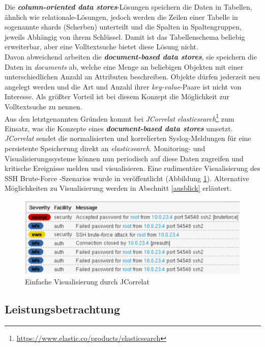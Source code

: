 Die \textbf{\emph{column-oriented data stores}}-Lösungen speichern die Daten in Tabellen, 
ähnlich wie relationale-Lösungen, jedoch werden die Zeilen einer Tabelle in sogenannte 
shards (Scherben) unterteilt und die Spalten in Spaltengruppen, jeweils Abhängig von 
ihrem Schlüssel. Damit ist das Tabellenschema beliebig erweiterbar, aber eine 
Volltextsuche bietet diese Lösung nicht.\\

Davon abweichend arbeiten die \textbf{\emph{document-based data stores}}, sie speichern 
die Daten in \textit{documents} ab, welche eine Menge an beliebigen Objekten mit einer 
unterschiedlichen Anzahl an Attributen beschreiben. Objekte dürfen jederzeit neu 
angelegt werden und die Art und Anzahl ihrer \textit{key-value}-Paare ist nicht von 
Interesse. Als größter Vorteil ist bei diesem Konzept die Möglichkeit zur Volltextsuche 
zu nennen.\\

Aus den letztgenannten Gründen kommt bei \textit{JCorrelat} 
\textit{elasticsearch}\footnote{\url{https://www.elastic.co/products/elasticsearch}} zum 
Einsatz, was die Konzepte eines \textbf{\emph{document-based data stores}} umsetzt. 
\textit{JCorrelat} sendet die normalisierten und korrelierten Syslog-Meldungen für eine 
persistente Speicherung direkt an \textit{elasticsearch}. Monitoring- und 
Visualisierungssysteme können nun periodisch auf diese Daten zugreifen und kritische 
Ereignisse melden und visualisieren. Eine rudimentäre Visualisierung des SSH Brute-Force 
-Szenarios wurde in \cite{reissmann} veröffentlicht (Abbildung \ref{pic:logvis}). 
Alternative Möglichkeiten zu Visualisierung werden in Abschnitt \ref{ausblick} erläutert. 

\begin{figure}[htbp]
    \caption{Einfache Visualisierung durch JCorrelat}
    \label{pic:logvis}\vspace{0.2cm}
    \centering
    \includegraphics[scale=0.42]{img/correlat-ui}  
\end{figure}
\newpage
\subsection{Leistungsbetrachtung}\label{performance}

